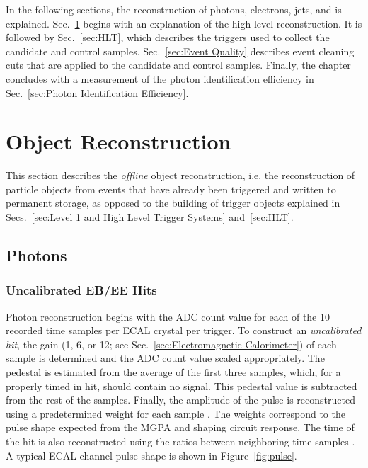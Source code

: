 \documentclass[dissertation.tex]{subfiles}
\begin{document}
In the following sections, the reconstruction of photons, electrons, jets, and \MET is explained.  Sec.~\ref{sec:Object Reconstruction} begins with an explanation of the high level reconstruction.  It is followed by Sec.~\ref{sec:HLT}, which describes the triggers used to collect the candidate and control samples.  Sec.~\ref{sec:Event Quality} describes event cleaning cuts that are applied to the candidate and control samples.  Finally, the chapter concludes with a measurement of the photon identification efficiency in Sec.~\ref{sec:Photon Identification Efficiency}.

\section{Object Reconstruction}
\label{sec:Object Reconstruction}

This section describes the \textit{offline} object reconstruction, i.e. the reconstruction of particle objects from events that have already been triggered and written to permanent storage, as opposed to the building of trigger objects explained in Secs.~\ref{sec:Level 1 and High Level Trigger Systems} and~\ref{sec:HLT}.

\subsection{Photons}
\label{sec:Photons}

\subsubsection{Uncalibrated EB/EE Hits}
\label{sec:Uncalibrated EB/EE Hits}

Photon reconstruction begins with the ADC count value for each of the 10 recorded time samples per ECAL crystal per trigger.  To construct an \textit{uncalibrated hit}, the gain (1, 6, or 12; see Sec.~\ref{sec:Electromagnetic Calorimeter}) of each sample is determined and the ADC count value scaled appropriately.  The pedestal is estimated from the average of the first three samples, which, for a properly timed in hit, should contain no signal.  This pedestal value is subtracted from the rest of the samples.  Finally, the amplitude of the pulse is reconstructed using a predetermined weight for each sample \cite{Bruneliere}.  The weights correspond to the pulse shape expected from the MGPA and shaping circuit response.  The time of the hit is also reconstructed using the ratios between neighboring time samples \cite{time_reco}.  A typical ECAL channel pulse shape is shown in Figure~\ref{fig:pulse}.
\end{document}
